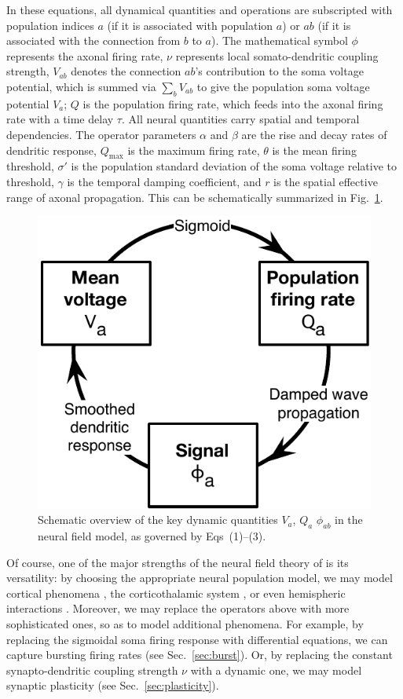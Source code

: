 \documentclass[preprint,review,10pt,authoryear,letterpaper]{elsarticle}
\begin{document}
In these equations, all dynamical quantities and operations are subscripted with population indices \(a\) (if it is associated with population \(a\)) or \(ab\) (if it is associated with the connection from \(b\) to \(a\)). The mathematical symbol \(\phi\) represents the axonal firing rate, \(\nu\) represents local somato-dendritic coupling strength, \(V_{ab}\) denotes the connection \(ab\)'s contribution to the soma voltage potential, which is summed via \(\sum_b V_{ab}\) to give the population soma voltage potential \(V_a\); \(Q\) is the population firing rate, which feeds into the axonal firing rate with a time delay \(\tau\). All neural quantities carry spatial and temporal dependencies. The operator parameters \(\alpha\) and \(\beta\) are the rise and decay rates of dendritic response, \(Q_\textrm{max}\) is the maximum firing rate, \(\theta\) is the mean firing threshold, \(\sigma'\) is the population standard deviation of the soma voltage relative to threshold, \(\gamma\) is the temporal damping coefficient, and \(r\) is the spatial effective range of axonal propagation. This can be schematically summarized in Fig.~\ref{fig:eirs_cycle}.

\begin{figure}[ht]
\begin{center}
\includegraphics[width=0.40\columnwidth]{EIRS_cycle}
\caption{Schematic overview of the key dynamic quantities \(V_a\), \(Q_a\) \(\phi_{ab}\) in the neural field model, as governed by Eqs~(1)--(3).}
\label{fig:eirs_cycle}
\end{center}
\end{figure}

Of course, one of the major strengths of the neural field theory of \citet{Robinson2005} is its versatility: by choosing the appropriate neural population model, we may model cortical phenomena \citep{}, the corticothalamic system \citep{}, or even hemispheric interactions \citep{}. Moreover, we may replace the operators above with more sophisticated ones, so as to model additional phenomena. For example, by replacing the sigmoidal soma firing response with differential equations, we can capture bursting firing rates (see Sec.~\ref{sec:burst}). Or, by replacing the constant synapto-dendritic coupling strength \(\nu\) with a dynamic one, we may model synaptic plasticity (see Sec.~\ref{sec:plasticity}).
\end{document}
